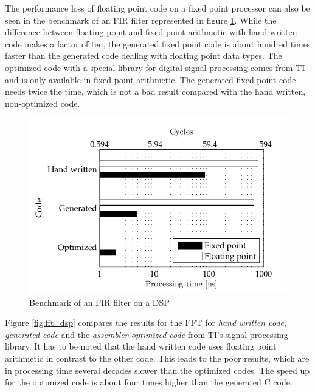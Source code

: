 The performance loss of floating point code on a fixed point processor can also be seen in the benchmark of an \ac{FIR} filter represented in figure \ref{fig:fir_dsp}. While the difference between floating point and fixed point arithmetic with hand written code makes a factor of ten, the generated fixed point code is about hundred times faster than the generated code dealing with floating point data types. The optimized code with a special library for digital signal processing comes from \ac{TI} and is only available in fixed point arithmetic. The generated fixed point code needs twice the time, which is not a bad result compared with the hand written, non-optimized code.

\begin{figure}[htbp]
	\centering
		\includegraphics{../kapitel02/figures/fir_dsp.pdf}
	\caption{Benchmark of an FIR filter on a DSP}
	\label{fig:fir_dsp}
\end{figure}

Figure \ref{fig:fft_dsp} compares the results for the \ac{FFT} for \emph{hand written code}, \emph{generated code} and the \emph{assembler optimized code} from TI's signal processing library. It has to be noted that the hand written code uses floating point arithmetic in contrast to the other code. This leads to the poor results, which are in processing time several decades slower than the optimized codes. The speed up for the optimized code is about four times higher than the generated C code.

